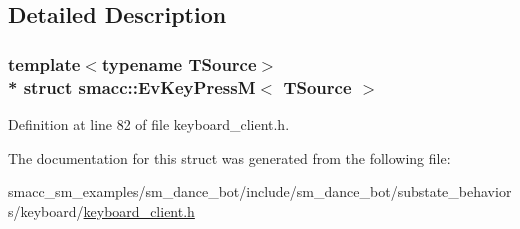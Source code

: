 \subsection{Detailed Description}
\subsubsection*{template$<$typename T\+Source$>$\\*
struct smacc\+::\+Ev\+Key\+Press\+M$<$ T\+Source $>$}



Definition at line 82 of file keyboard\+\_\+client.\+h.



The documentation for this struct was generated from the following file\+:\begin{DoxyCompactItemize}
\item 
smacc\+\_\+sm\+\_\+examples/sm\+\_\+dance\+\_\+bot/include/sm\+\_\+dance\+\_\+bot/substate\+\_\+behaviors/keyboard/\hyperlink{keyboard__client_8h}{keyboard\+\_\+client.\+h}\end{DoxyCompactItemize}
